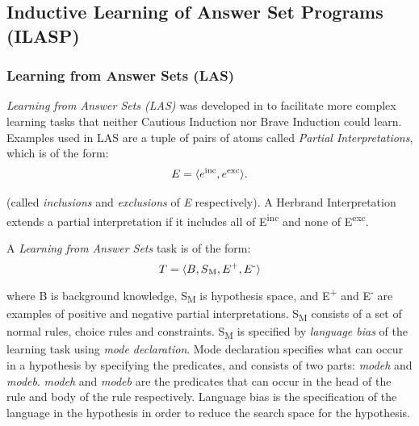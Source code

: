 \documentclass[11pt,twoside]{report}
\theoremstyle{plain}
\theoremstyle{definition}
\begin{document}
\subsection{Inductive Learning of Answer Set Programs (ILASP)}
\label{section_lasp}

\subsubsection{Learning from Answer Sets (LAS)}
\textit{Learning from Answer Sets (LAS)} was developed in \cite{Law2014} to facilitate more complex learning tasks that neither Cautious Induction nor Brave Induction could learn.
Examples used in LAS are a tuple of pairs of atoms called \textit{Partial Interpretations}, which is of the form:
\begin{equation}
\begin{split}
E = \langle e\textsuperscript{inc}, e\textsuperscript{exc} \rangle. 
\end{split}
\label{partial_interpretations}
\end{equation}

(called \textit{inclusions} and \textit{exclusions} of \textit{E} respectively).  A Herbrand Interpretation extends a partial interpretation if it includes all of E\textsuperscript{inc} and none of E\textsuperscript{exc}.

A \textit{Learning from Answer Sets} task is of the form:
\begin{equation}
\begin{split}
T = \langle B, S\textsubscript{M}, E\textsuperscript{+}, E\textsuperscript{-} \rangle
\end{split}
\label{las}
\end{equation}
where B is background knowledge, S\textsubscript{M} is hypothesis space, and E\textsuperscript{+} and E\textsuperscript{-} are examples of positive and negative partial interpretations. S\textsubscript{M} consists of a set of normal rules, choice rules and constraints. 
S\textsubscript{M} is specified by \textit{language bias} of the learning task using \textit{mode declaration}. Mode declaration specifies what can occur in a hypothesis by specifying the predicates, and consists of two parts: \textit{modeh} and \textit{modeb}.  \textit{modeh} and \textit{modeb} are the predicates that can occur in the head of the rule and body of the rule respectively. Language bias is the specification of the language in the hypothesis in order to reduce the search space for the hypothesis.
\end{document}
